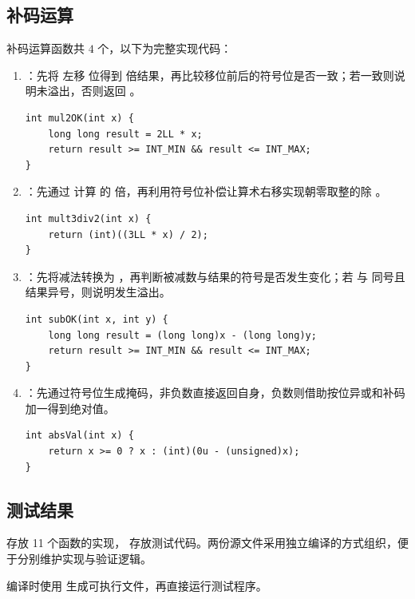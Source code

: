 \documentclass[12pt, a4paper]{academics}
\begin{document}
\subsection{补码运算}

补码运算函数共 $4$ 个，以下为完整实现代码：

\begin{enumerate}
    \item {}：先将  左移  位得到  倍结果，再比较移位前后的符号位是否一致；若一致则说明未溢出，否则返回 。
    \begin{verbatim}
int mul2OK(int x) {
    long long result = 2LL * x;
    return result >= INT_MIN && result <= INT_MAX;
}
    \end{verbatim}

    \item {}：先通过  计算  的  倍，再利用符号位补偿让算术右移实现朝零取整的除 。
    \begin{verbatim}
int mult3div2(int x) {
    return (int)((3LL * x) / 2);
}
    \end{verbatim}

    \item {}：先将减法转换为 ，再判断被减数与结果的符号是否发生变化；若  与  同号且结果异号，则说明发生溢出。
    \begin{verbatim}
int subOK(int x, int y) {
    long long result = (long long)x - (long long)y;
    return result >= INT_MIN && result <= INT_MAX;
}
    \end{verbatim}

    \item {}：先通过符号位生成掩码，非负数直接返回自身，负数则借助按位异或和补码加一得到绝对值。
    \begin{verbatim}
int absVal(int x) {
    return x >= 0 ? x : (int)(0u - (unsigned)x);
}
    \end{verbatim}
\end{enumerate}

\subsection{测试结果}

 存放 11 个函数的实现， 存放测试代码。两份源文件采用独立编译的方式组织，便于分别维护实现与验证逻辑。

编译时使用  生成可执行文件，再直接运行测试程序。
\end{document}
